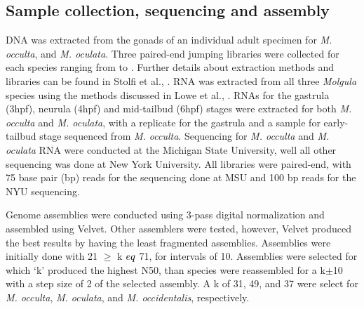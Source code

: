 \subsection{Sample collection, sequencing and assembly}
DNA was extracted from the gonads of an individual adult specimen for %
\textit{M. occulta}, and \textit{M. oculata}. Three paired-end jumping libraries were collected for each species ranging from  to . Further details about extraction methods and libraries can be found in Stolfi et al., \cite{stolfi_divergent_2014}. RNA was extracted from all three \textit{Molgula} species using the methods discussed in Lowe et al., \cite{lowe_evaluating_2014}. RNAs for the gastrula (3hpf), neurula (4hpf) and mid-tailbud (6hpf) stages were extracted for both \textit{M. occulta} and \textit{M. oculata}, with a replicate for the gastrula and a sample for early-tailbud stage sequenced from \textit{M. occulta}. %
Sequencing for \textit{M. occulta} and \textit{M. oculata} RNA were conducted at the Michigan State University, well all other sequencing was done at New York University. All libraries were paired-end, with 75 base pair (bp) reads for the sequencing done at MSU and 100 bp reads for the NYU sequencing. 

Genome assemblies were conducted using 3-pass digital normalization \cite{brown_reference-free_2012} and assembled using Velvet\cite{zerbino_velvet:_2008}. Other assemblers were tested, however, Velvet produced the best results by having the least fragmented assemblies. Assemblies were initially done with 21 $\geq$ k $\/eq$ 71, for intervals of 10. Assemblies were selected for which `k' produced the highest N50, than species were reassembled for a k$\pm$10 with a step size of 2 of the selected assembly. A k of 31, 49, and 37 were select for \textit{M. occulta}, \textit{M. oculata}, and \textit{M. occidentalis}, respectively. 

